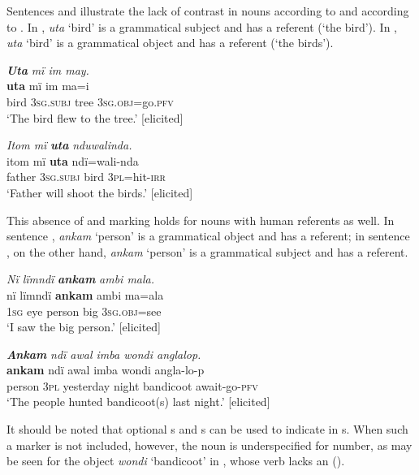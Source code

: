   Sentences  and  illustrate the lack of contrast in nouns according to  and according to . In , \textit{uta} ‘bird’ is a grammatical subject and has a  referent (‘the bird’). In , \textit{uta} ‘bird’ is a grammatical object and has a  referent (‘the birds’).

\ea%
    \label{ex:nouns:12}
            \textbf{\textit{Uta}} \textit{mï im may.}\\
    \gll \textbf{uta}    mï      im    ma=i\\
    bird  \textsc{3sg.subj}  tree  \textsc{3sg.obj}=go.\textsc{pfv}\\
\glt `The bird flew to the tree.’ [elicited]
\z

\ea%
    \label{ex:nouns:13}
            \textit{Itom mï} \textbf{\textit{uta}} \textit{nduwalinda.}\\
\gll  itom  mï      \textbf{uta}    ndï=wali-nda\\
    father  \textsc{3sg.subj}  bird  \textsc{3pl}=hit-\textsc{irr}\\
\glt `Father will shoot the birds.’ [elicited]
\z

This absence of  and  marking holds for nouns with human referents as well. In sentence , \textit{ankam} ‘person’ is a grammatical object and has a  referent; in sentence , on the other hand, \textit{ankam} ‘person’ is a grammatical subject and has a  referent.

\ea%
    \label{ex:nouns:14}
            \textit{Nï lïmndï} \textbf{\textit{ankam}} \textit{ambi mala.}\\
\gll    nï    lïmndï  \textbf{ankam}  ambi  ma=ala\\
    \textsc{1sg}  eye    person  big    \textsc{3sg.obj}=see\\
\glt `I saw the big person.’ [elicited]
\z

\ea%
    \label{ex:nouns:15}
          \textbf{\textit{Ankam}} \textit{ndï awal imba wondi anglalop.}\\
\gll    \textbf{ankam}  ndï  awal    imba  wondi    angla-lo-p\\
    person  \textsc{3pl}  yesterday  night  bandicoot  await-go-\textsc{pfv}\\
\glt `The people hunted bandicoot(s) last night.’ [elicited]
\z

It should be noted that optional s and s can be used to indicate  in s. When such a marker is not included, however, the noun is underspecified for number, as may be seen for the object \textit{wondi} ‘bandicoot’ in , whose verb lacks an   ().

